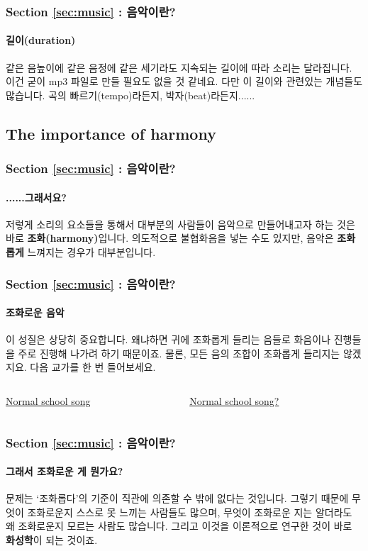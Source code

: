 \documentclass{beamer}
\begin{document}
	\begin{frame}
		\frametitle{Section \ref{sec:music} : 음악이란?}
		\framesubtitle{길이(duration)}
		같은 음높이에 같은 음정에 같은 세기라도 지속되는 길이에 따라 소리는 달라집니다. 이건 굳이 mp3 파일로 만들 필요도 없을 것 같네요. 다만 이 길이와 관련있는 개념들도 많습니다. 곡의 빠르기(tempo)라든지, 박자(beat)라든지......
	\end{frame}
	
	\subsection{The importance of harmony}
	\begin{frame}
		\frametitle{Section \ref{sec:music} : 음악이란?}
		\framesubtitle{......그래서요?}
		저렇게 소리의 요소들을 통해서 대부분의 사람들이 음악으로 만들어내고자 하는 것은 바로 {\bf 조화(harmony)}입니다. 의도적으로 불협화음을 넣는 수도 있지만, 음악은 {\bf 조화롭게} 느껴지는 경우가 대부분입니다.
	\end{frame}
	
	\begin{frame}
		\frametitle{Section \ref{sec:music} : 음악이란?}
		\framesubtitle{조화로운 음악}
		이 성질은 상당히 중요합니다. 왜냐하면 귀에 조화롭게 들리는 음들로 화음이나 진행들을 주로 진행해 나가려 하기 때문이죠. 물론, 모든 음의 조합이 조화롭게 들리지는 않겠지요. 다음 교가를 한 번 들어보세요.
		\vskip 1pc
		\begin{columns}
			\begin{column}{0.5\textwidth}
				\centering
				\color{cyan} \href{run:res/mp3/2/harmony/school.mp3}{Normal school song}
			\end{column}
			\begin{column}{0.5\textwidth}
				\centering
				\color{cyan} \href{run:res/mp3/2/harmony/school_weird.mp3}{Normal school song?}
			\end{column}
		\end{columns}
	\end{frame}
	
	\begin{frame}
		\frametitle{Section \ref{sec:music} : 음악이란?}
		\framesubtitle{그래서 조화로운 게 뭔가요?}
		문제는 `조화롭다'의 기준이 직관에 의존할 수 밖에 없다는 것입니다. 그렇기 때문에 무엇이 조화로운지 스스로 못 느끼는 사람들도 많으며, 무엇이 조화로운 지는 알더라도 왜 조화로운지 모르는 사람도 많습니다. 그리고 이것을 이론적으로 연구한 것이 바로 {\bf 화성학}이 되는 것이죠.
	\end{frame}
	
\end{document}
